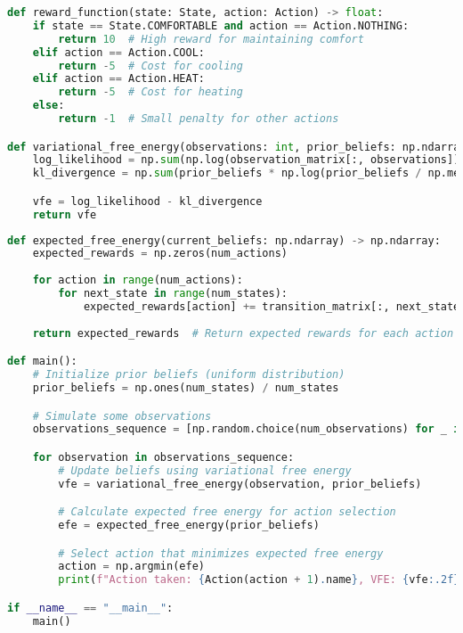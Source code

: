 \documentclass[11pt,a4paper]{article}
\begin{document}
\begin{lstlisting}[language=Python, caption={Implementation of the reward function and Variational Free Energy}]
def reward_function(state: State, action: Action) -> float:
    if state == State.COMFORTABLE and action == Action.NOTHING:
        return 10  # High reward for maintaining comfort
    elif action == Action.COOL:
        return -5  # Cost for cooling
    elif action == Action.HEAT:
        return -5  # Cost for heating
    else:
        return -1  # Small penalty for other actions

def variational_free_energy(observations: int, prior_beliefs: np.ndarray) -> float:
    log_likelihood = np.sum(np.log(observation_matrix[:, observations]))
    kl_divergence = np.sum(prior_beliefs * np.log(prior_beliefs / np.mean(prior_beliefs)))

    vfe = log_likelihood - kl_divergence
    return vfe
\end{lstlisting}

\begin{lstlisting}[language=Python, caption={Implementation of Expected Free Energy and main function}]
def expected_free_energy(current_beliefs: np.ndarray) -> np.ndarray:
    expected_rewards = np.zeros(num_actions)
    
    for action in range(num_actions):
        for next_state in range(num_states):
            expected_rewards[action] += transition_matrix[:, next_state, action] * reward_function(State(next_state + 1), Action(action + 1))
    
    return expected_rewards  # Return expected rewards for each action

def main():
    # Initialize prior beliefs (uniform distribution)
    prior_beliefs = np.ones(num_states) / num_states

    # Simulate some observations
    observations_sequence = [np.random.choice(num_observations) for _ in range(10)]

    for observation in observations_sequence:
        # Update beliefs using variational free energy
        vfe = variational_free_energy(observation, prior_beliefs)

        # Calculate expected free energy for action selection
        efe = expected_free_energy(prior_beliefs)

        # Select action that minimizes expected free energy
        action = np.argmin(efe)
        print(f"Action taken: {Action(action + 1).name}, VFE: {vfe:.2f}, EFE: {efe[action]:.2f}")

if __name__ == "__main__":
    main()
\end{lstlisting}
\end{document}
